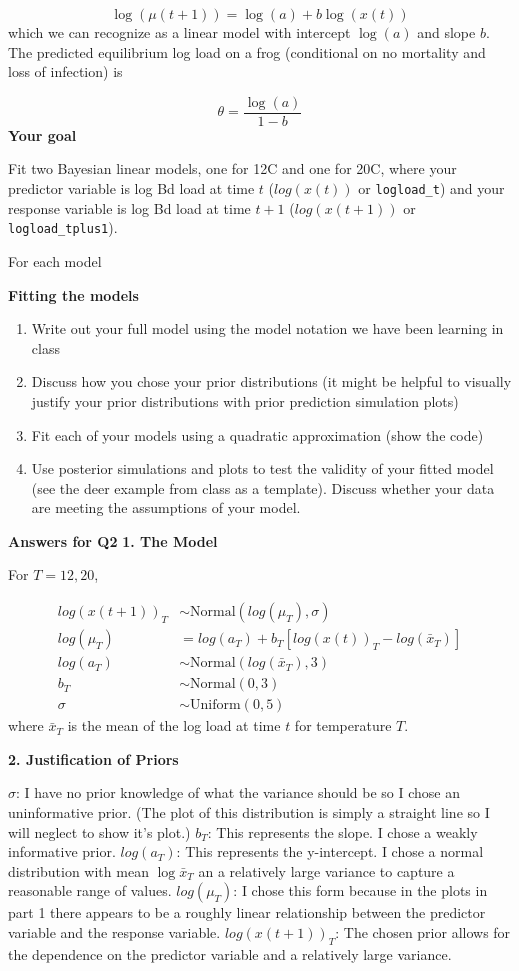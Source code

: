 \documentclass[
]{article}
\providecommand{\tightlist}{%
  \setlength{\itemsep}{0pt}\setlength{\parskip}{0pt}}
\begin{document}
\[
\log(\mu(t + 1)) = \log(a) + b \log(x(t))
\] which we can recognize as a linear model with intercept \(\log(a)\)
and slope \(b\). The predicted equilibrium log load on a frog
(conditional on no mortality and loss of infection) is

\[
\theta = \frac{\log(a)}{1 - b}
\] \textbf{Your goal}

Fit two Bayesian linear models, one for 12C and one for 20C, where your
predictor variable is log Bd load at time \(t\) (\(log(x(t))\) or
\texttt{logload\_t}) and your response variable is log Bd load at time
\(t + 1\) (\(log(x(t + 1))\) or \texttt{logload\_tplus1}).

For each model

\textbf{Fitting the models}

\begin{enumerate}
\def\labelenumi{\arabic{enumi}.}
\tightlist
\item
  Write out your full model using the model notation we have been
  learning in class
\item
  Discuss how you chose your prior distributions (it might be helpful to
  visually justify your prior distributions with prior prediction
  simulation plots)
\item
  Fit each of your models using a quadratic approximation (show the
  code)
\item
  Use posterior simulations and plots to test the validity of your
  fitted model (see the deer example from class as a template). Discuss
  whether your data are meeting the assumptions of your model.
\end{enumerate}

\textbf{Answers for Q2} \textbf{1. The Model}

For \(T={12,20}\),

\[
\begin{aligned}
log(x(t+1))_T &\sim \text{Normal}(log(\mu_T), \sigma) \\
log(\mu_T) &= log(a_{T}) + b_{T} [log(x(t))_T - log(\bar{x}_T)] \\
log(a_{T}) &\sim \text{Normal}(log(\bar{x}_T), 3) \\
b_{T} &\sim \text{Normal}(0, 3) \\
\sigma &\sim \text{Uniform}(0, 5)
\end{aligned}
\] where \(\bar{x}_T\) is the mean of the log load at time \(t\) for
temperature \(T\).

\textbf{2. Justification of Priors}

\(\sigma\): I have no prior knowledge of what the variance should be so
I chose an uninformative prior. (The plot of this distribution is simply
a straight line so I will neglect to show it's plot.) \(b_{T}\): This
represents the slope. I chose a weakly informative prior.
\(log(a_{T})\): This represents the y-intercept. I chose a normal
distribution with mean \(\log{\bar{x}_T}\) an a relatively large
variance to capture a reasonable range of values. \(log(\mu_T)\): I
chose this form because in the plots in part 1 there appears to be a
roughly linear relationship between the predictor variable and the
response variable. \(log(x(t+1))_T\): The chosen prior allows for the
dependence on the predictor variable and a relatively large variance.
\end{document}
